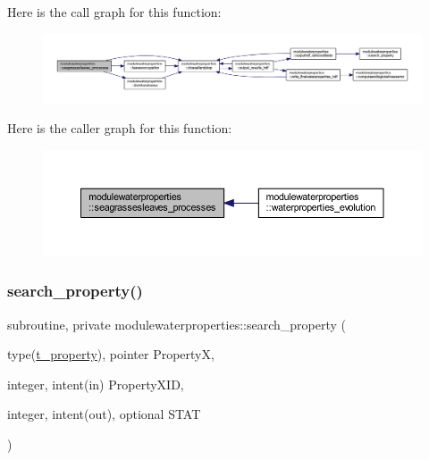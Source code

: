 Here is the call graph for this function\+:\nopagebreak
\begin{figure}[H]
\begin{center}
\leavevmode
\includegraphics[width=350pt]{namespacemodulewaterproperties_adf800c8c0d5bdc30d00d4b10c88f9693_cgraph}
\end{center}
\end{figure}
Here is the caller graph for this function\+:\nopagebreak
\begin{figure}[H]
\begin{center}
\leavevmode
\includegraphics[width=350pt]{namespacemodulewaterproperties_adf800c8c0d5bdc30d00d4b10c88f9693_icgraph}
\end{center}
\end{figure}
\mbox{\label{namespacemodulewaterproperties_ae6b7d758da27fb15faee52b3ed14029d}} 
\subsubsection{\texorpdfstring{search\+\_\+property()}{search\_property()}}
{\footnotesize\ttfamily subroutine, private modulewaterproperties\+::search\+\_\+property (\begin{DoxyParamCaption}\item[{type(\mbox{\hyperlink{structmodulewaterproperties_1_1t__property}{t\+\_\+property}}), pointer}]{PropertyX,  }\item[{integer, intent(in)}]{Property\+X\+ID,  }\item[{integer, intent(out), optional}]{S\+T\+AT }\end{DoxyParamCaption})\hspace{0.3cm}{\ttfamily [private]}}

